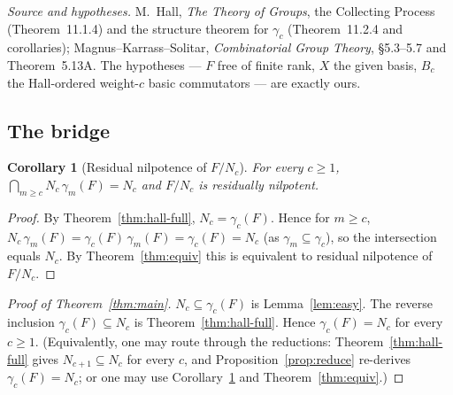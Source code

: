 \documentclass{amsart}
\newtheorem{corollary}{Corollary}
\theoremstyle{definition}
\theoremstyle{remark}
\begin{document}
\smallskip
\emph{Source and hypotheses.} M.\ Hall, \emph{The Theory of Groups}, the Collecting
Process (Theorem~11.1.4) and the structure theorem for $\gamma_c$ (Theorem~11.2.4
and corollaries); Magnus--Karrass--Solitar, \emph{Combinatorial Group Theory},
\S5.3--5.7 and Theorem~5.13A. The hypotheses --- $F$ free of finite rank, $X$ the
given basis, $B_c$ the Hall-ordered weight-$c$ basic commutators --- are exactly
ours.

\subsection{The bridge}

\begin{corollary}[Residual nilpotence of $F/N_c$]\label{cor:resnil}
For every $c\ge1$, $\bigcap_{m\ge c}N_c\,\gamma_m(F)=N_c$ and $F/N_c$ is residually
nilpotent.
\end{corollary}

\begin{proof}
By Theorem~\ref{thm:hall-full}, $N_c=\gamma_c(F)$. Hence for $m\ge c$,
$N_c\,\gamma_m(F)=\gamma_c(F)\,\gamma_m(F)=\gamma_c(F)=N_c$ (as
$\gamma_m\subseteq\gamma_c$), so the intersection equals $N_c$. By
Theorem~\ref{thm:equiv} this is equivalent to residual nilpotence of $F/N_c$.
\end{proof}

\begin{proof}[Proof of Theorem~\ref{thm:main}]
$N_c\subseteq\gamma_c(F)$ is Lemma~\ref{lem:easy}. The reverse inclusion
$\gamma_c(F)\subseteq N_c$ is Theorem~\ref{thm:hall-full}. Hence
$\gamma_c(F)=N_c$ for every $c\ge1$. (Equivalently, one may route through the
reductions: Theorem~\ref{thm:hall-full} gives $N_{c+1}\subseteq N_c$ for every $c$,
and Proposition~\ref{prop:reduce} re-derives $\gamma_c(F)=N_c$; or one may use
Corollary~\ref{cor:resnil} and Theorem~\ref{thm:equiv}.)
\end{proof}
\end{document}
